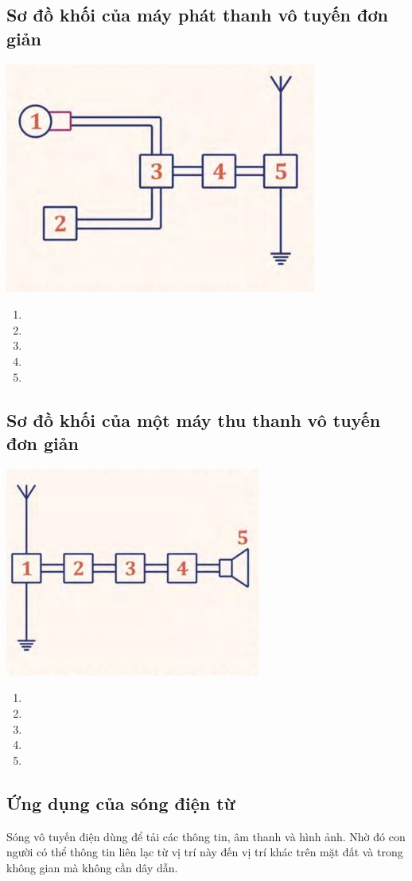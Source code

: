 \subsection {Sơ đồ khối của máy phát thanh vô tuyến đơn giản}
\begin{center}
	\includegraphics[scale=0.5]{../figs/4-4-1.JPG}
\end{center}
\begin{enumerate}
	\item {}
	\item {}
	\item {}
	\item {}
	\item  {}
\end{enumerate}
\subsection {Sơ đồ khối của một máy thu thanh vô tuyến đơn giản}
\begin{center}
	\includegraphics[scale=0.7]{../figs/4-4-2.JPG}
\end{center}
\begin{enumerate}
	\item {}
	\item {}
	\item {}
	\item {}
	\item {}
\end{enumerate}
\subsection {Ứng dụng của sóng điện từ}
Sóng vô tuyến điện dùng để tải các thông tin, âm thanh và hình ảnh. Nhờ đó con người có thể thông tin liên lạc từ vị trí này đến vị trí khác trên mặt đất và trong không gian mà không cần dây dẫn.